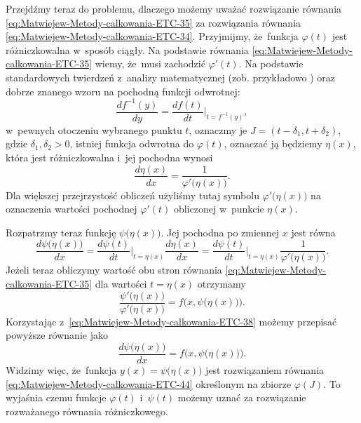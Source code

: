 \documentclass[a4paper,11pt]{article}
\numberwithin{equation}{section}
\begin{document}
Przejdźmy teraz do problemu, dlaczego możemy uważać rozwiązanie równania
\eqref{eq:Matwiejew-Metody-calkowania-ETC-35} za rozwiązania równania
\eqref{eq:Matwiejew-Metody-calkowania-ETC-34}. Przyjmijmy, że~funkcja
$\varphi( t )$ jest różniczkowalna w~sposób ciągły. Na podstawie równania
\eqref{eq:Matwiejew-Metody-calkowania-ETC-35} wiemy, że~musi zachodzić
$\varphi'( t )$. Na podstawie standardowych twierdzeń z~analizy matematycznej
(zob. przykładowo \cite{FichtenholzRachunekRozniczkowyETCVolI2005}) oraz
dobrze znanego wzoru na pochodną funkcji odwrotnej:
\begin{equation}
  \label{eq:Uwagi-do-konkrentych-stron-22}
  \frac{ d f^{ -1 }( y ) }{ dy } =
  \frac{ d f( t ) }{ d t }\bigg|_{ t = f^{ -1 }( y ) },
\end{equation}
w~pewnych otoczeniu wybranego punktu $t$, oznaczmy je
$J = ( t - \delta_{ 1 }, t + \delta_{ 2 } )$, gdzie $\delta_{ 1 }, \delta_{ 2 } > 0$, istniej
funkcja odwrotna do $\varphi( t )$, oznaczać ją będziemy $\eta( x )$, która jest
różniczkowalna i~jej pochodna wynosi
\begin{equation}
  \label{eq:Uwagi-do-konkrentych-stron-23}
  \frac{ d \eta( x ) }{ d x } =
  \frac{ 1 }{ \varphi'\big( \eta( x ) \big) }.
\end{equation}
Dla większej przejrzystość obliczeń użyliśmy tutaj symbolu
$\varphi'\big( \eta( x ) \big)$ na oznaczenia wartości pochodnej $\varphi'( t )$ obliczonej
w~punkcie $\eta( x )$.

Rozpatrzmy teraz funkcję $\psi\big( \eta( x ) \big)$. Jej pochodna po zmiennej $x$
jest równa
\begin{equation}
  \label{eq:Uwagi-do-konkrentych-stron-24}
  \frac{ d \psi\big( \eta( x ) \big) }{ d x } =
  \frac{ d \psi( t ) }{ d t }\bigg|_{ t = \eta( x ) }
  \frac{ d \eta( x ) }{ d x } =
  \frac{ d \psi( t ) }{ d t }\bigg|_{ t = \eta( x ) }
  \frac{ 1 }{ \varphi'\big( \eta( x ) \big)}.
\end{equation}
Jeżeli teraz obliczymy wartość obu stron równania
\eqref{eq:Matwiejew-Metody-calkowania-ETC-35} dla wartości $t = \eta( x )$
otrzymamy
\begin{equation}
  \label{eq:Uwagi-do-konkrentych-stron-25}
  \frac{ \psi'\big( \eta( x ) \big) }{ \varphi'\big( \eta( x ) \big) } =
  f\Big( x, \psi\big( \eta( x ) \big) \Big).
\end{equation}
Korzystając z~\eqref{eq:Matwiejew-Metody-calkowania-ETC-38} możemy przepisać
powyższe równanie jako
\begin{equation}
  \label{eq:Uwagi-do-konkrentych-stron-26}
  \frac{ d \psi\big( \eta( x ) \big) }{ d x } =
  f\Big( x, \psi\big( \eta( x ) \big) \big).
\end{equation}
Widzimy więc, że~funkcja $y( x ) = \psi\big( \eta( x ) \big)$ jest rozwiązaniem
równania \eqref{eq:Matwiejew-Metody-calkowania-ETC-44} określonym na zbiorze
$\varphi( J )$. To wyjaśnia czemu funkcje $\varphi( t )$ i~$\psi( t )$ możemy uznać za
rozwiązanie rozważanego równania różniczkowego.
\end{document}
